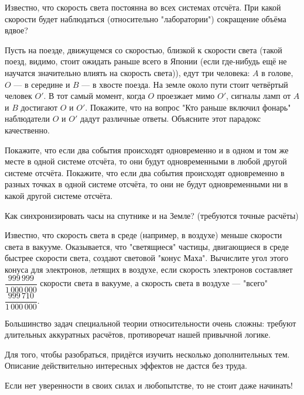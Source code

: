 \documentclass[a4paper,12pt]{article}
\begin{document}
Известно, что скорость света постоянна во всех системах отсчёта. При какой скорости будет наблюдаться (относительно "лаборатории") сокращение объёма вдвое?

Пусть на поезде, движущемся со скоростью, близкой к скорости света (такой поезд, видимо, стоит ожидать раньше всего в Японии (если где-нибудь ещё не научатся значительно влиять на скорость света)), едут три человека: $A$ в голове, $O$ --- в середине и  $B$ --- в хвосте поезда. На земле около пути стоит четвёртый человек $O'$. В тот самый момент, когда $O$ проезжает мимо $O'$, сигналы ламп от $A$ и $B$ достигают $O$ и $O'$.
Покажите, что на вопрос "Кто раньше включил фонарь" наблюдатели $O$ и $O'$ дадут различные ответы. Объясните этот парадокс качественно.

Покажите, что если два события происходят одновременно и в одном и том же месте в одной системе отсчёта, то они будут одновременными в любой другой системе отсчёта.
Покажите, что если два события происходят одновременно в разных точках в одной системе отсчёта, то они не будут одновременными ни в какой другой системе отсчёта.

Как синхронизировать часы на спутнике и на Земле? (требуются точные расчёты)

Известно, что скорость света в среде (например, в воздухе) меньше скорости света в вакууме. Оказывается, что "светящиеся" частицы, двигающиеся в среде быстрее скорости света, создают световой "конус Маха". Вычислите угол этого конуса для электронов, летящих в воздухе, если скорость электронов составляет $\dfrac{999\,999}{1\,000\,000}$ скорости света в вакууме, а скорость света в воздухе --- "всего" $\dfrac{999\,710}{1\,000\,000}$.

Большинство задач специальной теории относительности очень сложны: требуют длительных аккуратных расчётов, противоречат нашей привычной логике.

Для того, чтобы разобраться, придётся изучить несколько дополнительных тем. Описание действительно интересных эффектов не дастся без труда.

Если нет уверенности в своих силах и любопытстве, то не стоит даже начинать!
\end{document}
